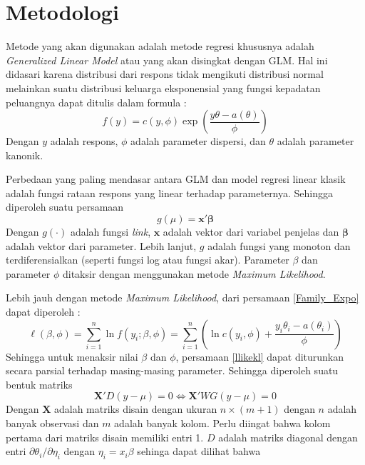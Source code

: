 \documentclass[12pt]{article}
\begin{document}
\newpage
\section{Metodologi}
Metode yang akan digunakan adalah metode regresi khususnya adalah \textit{Generalized Linear Model} atau yang akan disingkat dengan GLM. Hal ini didasari karena distribusi dari respons tidak mengikuti distribusi normal melainkan suatu distribusi keluarga eksponensial yang fungsi kepadatan peluangnya dapat ditulis dalam formula : 
\begin{equation}
\label{Family_Expo}
    f(y) = c(y,\phi)\exp\left(\frac{y\theta-a(\theta)}{\phi}\right)
\end{equation}
Dengan $y$ adalah respons, $\phi$ adalah parameter dispersi, dan $\theta$ adalah parameter kanonik. 
\par 
Perbedaan yang paling mendasar antara GLM dan model regresi linear klasik adalah fungsi rataan respons yang linear terhadap parameternya. Sehingga diperoleh suatu persamaan 
\begin{equation}
    \label{ge_el_em}
    g(\mu) = \mathbf{x}'\mathbf{\beta}
\end{equation}
Dengan $g(\cdot)$ adalah fungsi \textit{link}, $\mathbf{x}$ adalah vektor dari variabel penjelas dan $\mathbf{\beta}$ adalah vektor dari parameter. Lebih lanjut, $g$ adalah fungsi yang monoton dan terdiferensialkan (seperti fungsi log atau fungsi akar). Parameter $\beta$ dan parameter $\phi$ ditaksir dengan menggunakan metode \textit{Maximum Likelihood}.
\par
Lebih jauh dengan metode \textit{Maximum Likelihood}, dari persamaan \ref{Family_Expo} dapat diperoleh :
\begin{equation}
    \label{llikekl}
    \ell(\beta,\phi) = \sum_{i=1}^n \ln{f(y_i;\beta,\phi)}=\sum_{i=1}^n \left(\ln{c(y_i,\phi)}+\frac{y_i\theta_i-a(\theta_i)}{\phi}\right)
\end{equation}
Sehingga untuk menaksir nilai $\beta$ dan $\phi$, persamaan \ref{llikekl} dapat diturunkan secara parsial terhadap masing-masing parameter. Sehingga diperoleh suatu bentuk matriks
\begin{equation}
    \label{matrisk}
    \mathbf{X}'D(y-\mu) = 0 \Longleftrightarrow \mathbf{X}'WG(y-\mu)=0
\end{equation}
Dengan $\mathbf{X}$ adalah matriks disain dengan ukuran $n\times (m+1)$ dengan $n$ adalah banyak observasi dan $m$ adalah banyak kolom. Perlu diingat bahwa kolom pertama dari matriks disain memiliki entri 1. $D$ adalah matriks diagonal dengan entri $\partial \theta_i/\partial \eta_i$ dengan $\eta_i = x_i\beta$ sehinga dapat dilihat bahwa 
\end{document}
